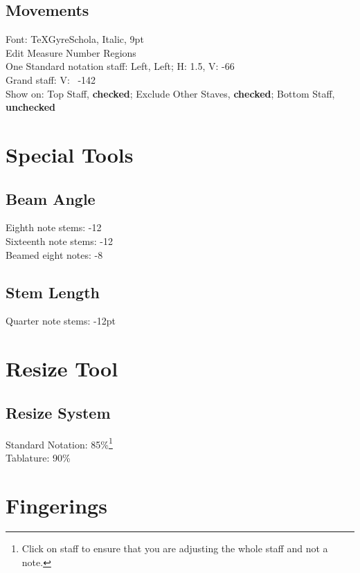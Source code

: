 \documentclass[]{memoir}
\begin{document}
\section{Movements}
\label{sec:movements}

Font: TeXGyreSchola, Italic, 9pt\\
Edit Measure Number Regions\\
One Standard notation staff: Left, Left; H: 1.5, V: -66\\
Grand staff: V: ~-142\\
Show on: Top Staff, \textbf{checked}; Exclude Other Staves, \textbf{checked}; Bottom Staff, \textbf{unchecked}

\chapter{Special Tools}
\label{sec:special-tools}

\section{Beam Angle}
\label{sec:beam-angle}

Eighth note stems: -12\\
Sixteenth note stems: -12\\
Beamed eight notes: -8

\section{Stem Length}
\label{sec:stem-length}

Quarter note stems: -12pt

\chapter{Resize Tool}
\label{sec:resize-tool}

\section{Resize System}
\label{sec:resize-system}

Standard Notation: 85\%\footnote{Click on staff to ensure that you are adjusting the whole staff and not a note.}\\

\noindent Tablature: 90\%

\chapter{Fingerings}
\label{sec:fingerings}
\end{document}
